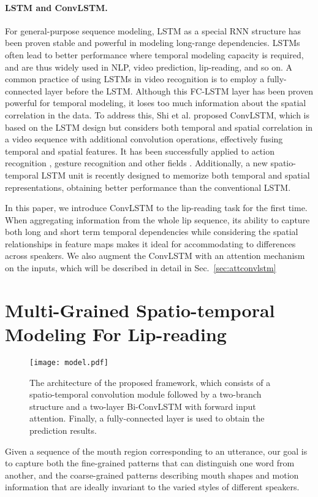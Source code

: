 \documentclass{bmvc2k}
\begin{document}
\paragraph{LSTM and ConvLSTM.}For general-purpose sequence modeling, LSTM \cite{hochreiter1997long} as a special RNN structure has been proven stable and powerful in modeling long-range dependencies. LSTMs often lead to better performance where temporal modeling capacity is required, and are thus widely used in NLP, video prediction, lip-reading, and so on. A common practice of using LSTMs in video recognition is to employ a fully-connected layer before the LSTM. Although this FC-LSTM layer has been proven powerful for temporal modeling, it loses too much information about the spatial correlation in the data. To address this, Shi et al. proposed ConvLSTM\cite{Shi2015Convolutional}, which is based on the LSTM design but considers both temporal and spatial correlation in a video sequence with additional convolution operations, effectively fusing temporal and spatial features. It has been successfully applied to action recognition \cite{li2018videolstm,wang2018human}, gesture recognition \cite{zhu2017multimodal,1zhang2017learning} and other fields \cite{sudhakaran2017convolutional}. Additionally, a new spatio-temporal LSTM unit \cite{1wang2017predrnn} is recently designed to memorize both temporal and spatial representations, obtaining better performance than the conventional LSTM.

In this paper, we introduce ConvLSTM to the lip-reading task for the first time. When aggregating information from the whole lip sequence, its ability to capture both long and short term temporal dependencies while considering the spatial relationships in feature maps makes it ideal for accommodating to differences across speakers. We also augment the ConvLSTM with an attention mechanism on the inputs, which will be described in detail in Sec.~\ref{sec:attconvlstm}


\vspace{-1em}
\section{Multi-Grained Spatio-temporal Modeling For Lip-reading}
\begin{figure*}
  \centering
  \texttt{[image: model.pdf]}
\caption{The architecture of the proposed framework, which consists of a spatio-temporal convolution module followed by a two-branch structure and a two-layer Bi-ConvLSTM with forward input attention. Finally, a fully-connected layer is used to obtain the prediction results.}
\label{fig:whole}
\vspace{-1em}
\end{figure*}
Given a sequence of the mouth region corresponding to an utterance, our goal is to capture both the fine-grained patterns that can distinguish one word from another, and the coarse-grained patterns describing mouth shapes and motion information that are ideally invariant to the varied styles of different speakers.
\end{document}
